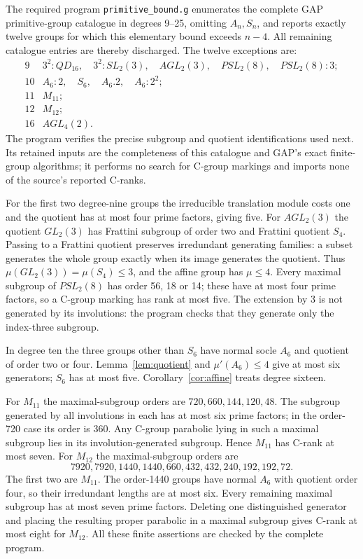 The required program \texttt{primitive\_bound.g} enumerates the complete
GAP primitive-group catalogue in degrees 9--25, omitting $A_n,S_n$,
and reports exactly twelve groups for which this elementary bound
exceeds $n-4$. All remaining catalogue entries are thereby discharged.
The twelve exceptions are:
\begin{equation}\label{eq:primitiveexceptions}
\begin{array}{c|l}
9&3^2\!:\!QD_{16},\quad3^2\!:\!SL_2(3),\quad AGL_2(3),\quad
 PSL_2(8),\quad PSL_2(8)\!:\!3;\\
10&A_6\!:\!2,\quad S_6,\quad A_6\!.\!2,\quad A_6\!:\!2^2;\\
11&M_{11};\\12&M_{12};\\16&AGL_4(2).
\end{array}                                                   \end{equation}
The program verifies the precise subgroup and quotient identifications
used next. Its retained inputs are the completeness of this catalogue
and GAP's exact finite-group algorithms; it performs no search for
C-group markings and imports none of the source's reported C-ranks.

For the first two degree-nine groups the irreducible translation module
costs one and the quotient has at most four prime factors, giving five.
For $AGL_2(3)$ the quotient $GL_2(3)$ has Frattini subgroup of order two
and Frattini quotient $S_4$. Passing to a Frattini quotient preserves
irredundant generating families: a subset generates the whole group
exactly when its image generates the quotient. Thus $\mu(GL_2(3))
=\mu(S_4)\leq3$, and the affine group has $\mu\leq4$.
Every maximal subgroup of $PSL_2(8)$ has order 56, 18 or 14; these have
at most four prime factors, so a C-group marking has rank at most five.
The extension by 3 is not generated by its involutions: the program
checks that they generate only the index-three subgroup.

In degree ten the three groups other than $S_6$ have normal socle
$A_6$ and quotient of order two or four. Lemma~\ref{lem:quotient}
and $\mu'(A_6)\leq4$ give at most six generators; $S_6$ has at most
five. Corollary~\ref{cor:affine} treats degree sixteen.

For $M_{11}$ the maximal-subgroup orders are
$720,660,144,120,48$. The subgroup generated by all involutions in
each has at most six prime factors; in the order-720 case its order
is 360. Any C-group parabolic lying in such a maximal subgroup lies
in its involution-generated subgroup. Hence $M_{11}$ has C-rank at
most seven. For $M_{12}$ the maximal-subgroup orders are
\[
7920,7920,1440,1440,660,432,432,240,192,192,72.
\]
The first two are $M_{11}$. The order-1440 groups have normal $A_6$
with quotient order four, so their irredundant lengths are at most six.
Every remaining maximal subgroup has at most seven prime factors.
Deleting one distinguished generator and placing the resulting proper
parabolic in a maximal subgroup gives C-rank at most eight for $M_{12}$.
All these finite assertions are checked by the complete program.

